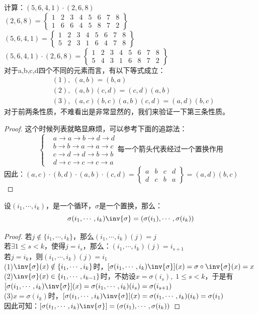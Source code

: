 计算：$(5,6,4,1)\cdot(2,6,8)$\\
$(2,6,8)=\left\{
\begin{array}{cccccccc}
1&2&3&4&5&6&7&8\\
1&6&6&4&5&8&7&2
\end{array}\right\}$\\
$(5,6,4,1)=\left\{
\begin{array}{cccccccc}
1&2&3&4&5&6&7&8\\
5&2&3&1&6&4&7&8
\end{array}\right\}$\\
$(5,6,4,1)\cdot(2,6,8)=\left\{
\begin{array}{cccccccc}
1&2&3&4&5&6&7&8\\
5&4&3&1&6&8&7&2
\end{array}\right\}$\\
对于a,b,c,d四个不同的元素而言，有以下等式成立：
\begin{align*}
&(1),\;(a,b)=(b,a)\\
&(2),\;(a,b)(c,d)=(c,d)(a,b)\\
&(3),\;(a,c)(b,c)(a,b)(c,d)=(a,d)(b,c)
\end{align*}
对于前两条性质，不难看出是非常显然的，我们来验证一下第三条性质。
\begin{proof}
这个时候列表就略显麻烦，可以参考下面的追踪法：\\
\[\left\{
\begin{aligned}
&a\to a\to b\to d\to d\\
&b\to b\to a\to a\to c\\
&c\to d\to d\to b\to b\\
&d\to c\to c\to c\to a
\end{aligned}\right.\text{每一个箭头代表经过一个置换作用}
\]
因此：$(a,c)\cdot(b,d)\cdot(a,b)\cdot(c,d)=
\left\{
\begin{array}{cccc}
a&b&c&d\\
d&c&b&a
\end{array}\right\}=(a,d)(b,c)$\\
\end{proof}
设$(i_1,\cdots,i_k)$，是一个循环，$\sigma$是一个置换，那么：
\[
\sigma(i_1,\cdots,i_k)\inv{\sigma}=(\sigma(i_1),\cdots,\sigma(i_k))
\]
\begin{proof}
若$j\notin \{i_1,\cdots,i_k\}$，那么$(i_1,\cdots,i_k)(j)=j$\\
若$\exists 1\leq s < k$，使得$j=i_s$，那么：$(i_1,\cdots,i_k)(j)=i_{s+1}$\\
若$j=i_k$，则$(i_1,\cdots,i_k)(j)=i_{1}$\\
(1)$\inv{\sigma}(x)\notin\{i_1,\cdots,i_k\}$时，$[\sigma(i_1,\cdots,i_k)\inv{\sigma}](x)=\sigma\circ\inv{\sigma}(x)=x$\\
(2)$\inv{\sigma}(x)\in\{i_1,\cdots,i_{k-1}\}$时，不妨设$x=\sigma(i_s),\; 1\leq s<k$，于是有$[\sigma(i_1,\cdots,i_k)\inv{\sigma}](x)=\sigma(i_1,\cdots,i_k)(i_s)=\sigma(i_{s+1})$\\
(3)$x=\sigma(i_k)$时，$[\sigma(i_1,\cdots,i_k)\inv{\sigma}](x)=\sigma(i_1,\cdots,i_k)(i_k)=\sigma(i_1)$\\
因此可知：$[\sigma(i_1,\cdots,i_k)\inv{\sigma}]=(\sigma(i_1),\cdots,\sigma(i_k))$
\end{proof}
